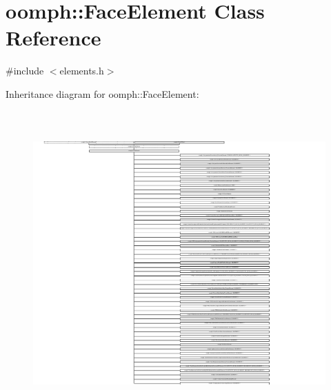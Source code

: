 \hypertarget{classoomph_1_1FaceElement}{}\section{oomph\+:\+:Face\+Element Class Reference}
\label{classoomph_1_1FaceElement}


{\ttfamily \#include $<$elements.\+h$>$}

Inheritance diagram for oomph\+:\+:Face\+Element\+:\begin{figure}[H]
\begin{center}
\leavevmode
\includegraphics[height=11.679473cm]{classoomph_1_1FaceElement}
\end{center}
\end{figure}
